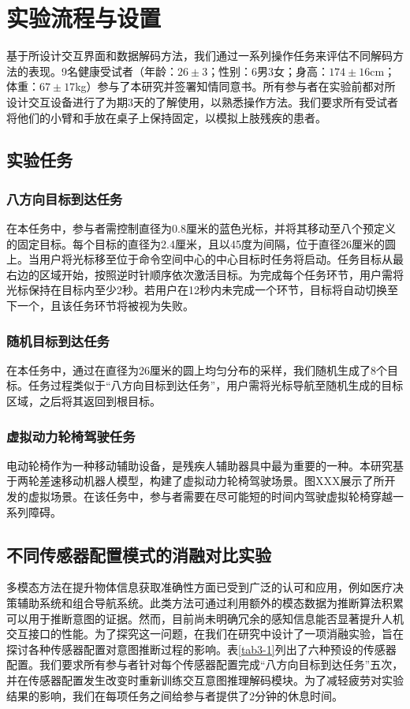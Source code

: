 \section{实验流程与设置}基于所设计交互界面和数据解码方法，我们通过一系列操作任务来评估不同解码方法的表现。9名健康受试者（年龄：$26\pm3$；性别：6男3女；身高：$174\pm16$cm；体重：$67\pm17$kg）参与了本研究并签署知情同意书。所有参与者在实验前都对所设计交互设备进行了为期3天的了解使用，以熟悉操作方法。我们要求所有受试者将他们的小臂和手放在桌子上保持固定，以模拟上肢残疾的患者。

\subsection{实验任务}   
    \subsubsection{八方向目标到达任务}在本任务中，参与者需控制直径为0.8厘米的蓝色光标，并将其移动至八个预定义的固定目标。每个目标的直径为2.4厘米，且以45度为间隔，位于直径26厘米的圆上。当用户将光标移至位于命令空间中心的中心目标时任务将启动。任务目标从最右边的区域开始，按照逆时针顺序依次激活目标。为完成每个任务环节，用户需将光标保持在目标内至少2秒。若用户在12秒内未完成一个环节，目标将自动切换至下一个，且该任务环节将被视为失败。

   \subsubsection{随机目标到达任务}在本任务中，通过在直径为26厘米的圆上均匀分布的采样，我们随机生成了8个目标。任务过程类似于``八方向目标到达任务''，用户需将光标导航至随机生成的目标区域，之后将其返回到根目标。

   \subsubsection{虚拟动力轮椅驾驶任务}电动轮椅作为一种移动辅助设备，是残疾人辅助器具中最为重要的一种。本研究基于两轮差速移动机器人模型，构建了虚拟动力轮椅驾驶场景。图XXX展示了所开发的虚拟场景。在该任务中，参与者需要在尽可能短的时间内驾驶虚拟轮椅穿越一系列障碍。  

\subsection{不同传感器配置模式的消融对比实验} 多模态方法在提升物体信息获取准确性方面已受到广泛的认可和应用，例如医疗决策辅助系统和组合导航系统\cite{williamsonContinuousUncertainInteraction2006}。此类方法可通过利用额外的模态数据为推断算法积累可以用于推断意图的证据。然而，目前尚未明确冗余的感知信息能否显著提升人机交互接口的性能。为了探究这一问题，在我们在研究中设计了一项消融实验，旨在探讨各种传感器配置对意图推断过程的影响。表\ref{tab3-1}列出了六种预设的传感器配置。我们要求所有参与者针对每个传感器配置完成``八方向目标到达任务''五次，并在传感器配置发生改变时重新训练交互意图推理解码模块。为了减轻疲劳对实验结果的影响，我们在每项任务之间给参与者提供了2分钟的休息时间。 

